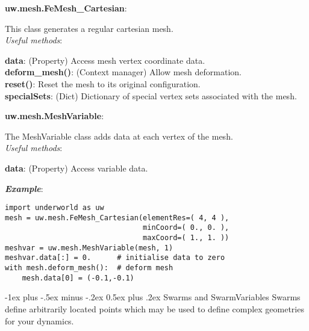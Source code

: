 \documentclass[10pt,landscape]{article}
\makeatletter
\renewcommand{\section}{\@startsection{section}{1}{0mm}%
                                {-1ex plus -.5ex minus -.2ex}%
                                {0.5ex plus .2ex}%
                                {\normalfont\large\bfseries}}
\makeatother
\begin{document}
\begin{multicols}{2}
\noindent\textbf{uw.mesh.FeMesh\_Cartesian}:
\begin{addmargin}[1em]{2em}
This class generates a regular cartesian mesh.\\
\vspace{1mm}
\textit{Useful methods}:\\
\begin{addmargin}[1em]{2em}
\textbf{data}: (Property) Access mesh vertex coordinate data.\\
\textbf{deform\_mesh()}: (Context manager) Allow mesh deformation.\\
\textbf{reset()}: Reset the mesh to its original configuration.\\
\textbf{specialSets}: (Dict) Dictionary of special vertex sets associated with the mesh.\\
\end{addmargin}
\end{addmargin}

\vspace{1mm}

\noindent\textbf{uw.mesh.MeshVariable}:
\begin{addmargin}[1em]{2em}
The MeshVariable class adds data at each vertex of the mesh.\\
\vspace{1mm}
\textit{Useful methods}:\\
\begin{addmargin}[1em]{2em}
\textbf{data}: (Property) Access variable data.\\
\end{addmargin}
\end{addmargin}

\vspace{2mm}
\noindent\textbf{\textit{Example}}:
\begin{lstlisting}
import underworld as uw
mesh = uw.mesh.FeMesh_Cartesian(elementRes=( 4, 4 ),
                                minCoord=( 0., 0. ),
                                maxCoord=( 1., 1. ))
meshvar = uw.mesh.MeshVariable(mesh, 1)
meshvar.data[:] = 0.      # initialise data to zero
with mesh.deform_mesh():  # deform mesh
    mesh.data[0] = (-0.1,-0.1)
\end{lstlisting}

\section{Swarms and SwarmVariables}
Swarms define arbitrarily located points which may be used to define complex
geometries for your dynamics.
\newline


\end{multicols}
\end{document}
